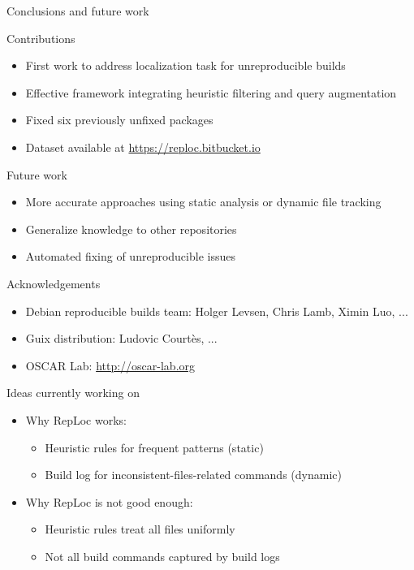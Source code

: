 \documentclass{beamer}
\begin{document}
\begin{frame}{Conclusions and future work}
\begin{block}{Contributions}
\begin{itemize}
\item First work to address localization task for unreproducible builds
\item Effective framework integrating heuristic filtering and query augmentation
\item Fixed six previously unfixed packages
\item Dataset available at \url{https://reploc.bitbucket.io}
\end{itemize}
\end{block}

\begin{block}{Future work}
\begin{itemize}
\item More accurate approaches using static analysis or dynamic file tracking
\item Generalize knowledge to other repositories
\item Automated fixing of unreproducible issues
\end{itemize}
\end{block}
\end{frame}

\begin{frame}{Acknowledgements}
\begin{itemize}
\item Debian reproducible builds team: Holger Levsen, Chris Lamb, Ximin Luo, ...
\item Guix distribution: Ludovic Courtès, ...
\item OSCAR Lab: \url{http://oscar-lab.org}
\end{itemize}
\end{frame}

\begin{frame}{Ideas currently working on}
\begin{itemize}
\item Why RepLoc works:
\begin{itemize}
\item Heuristic rules for frequent patterns (static)
\item Build log for inconsistent-files-related commands (dynamic)
\end{itemize}
\item Why RepLoc is not good enough:
\begin{itemize}
\item Heuristic rules treat all files uniformly
\item Not all build commands captured by build logs
\end{itemize}
\end{itemize}
\end{frame}
\end{document}
